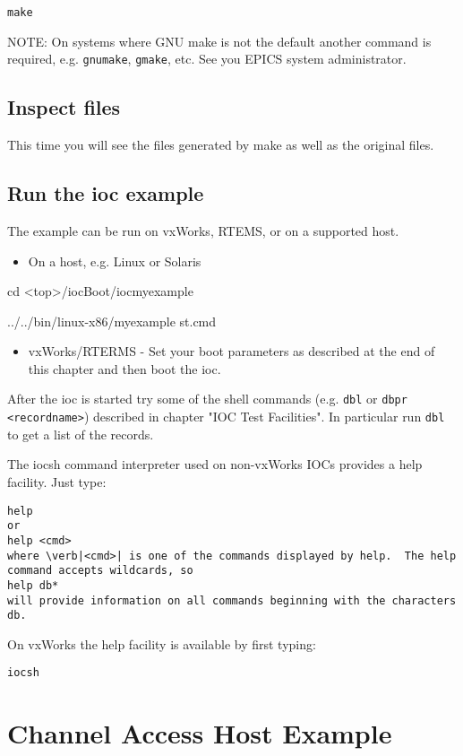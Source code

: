 \begin{verbatim}make
\end{verbatim}NOTE: On systems where GNU make is not the default another command is required, e.g. \verb|gnumake|, \verb|gmake|, etc. See 
you EPICS system administrator.

\subsection{Inspect files}

This time you will see the files generated by make as well as the original files.

\subsection{Run the ioc example}

The example can be run on vxWorks, RTEMS, or on a supported host.

\begin{itemize}\item On a host, e.g. Linux or Solaris

\end{itemize}cd \textless{}top\textgreater{}/iocBoot/iocmyexample

../../bin/linux-x86/myexample st.cmd

\begin{itemize}\item vxWorks/RTERMS - Set your boot parameters as described at the end of this chapter and then boot the ioc.

\end{itemize}After the ioc is started try some of the shell commands (e.g. \verb|dbl| or \verb|dbpr <recordname>|) described in chapter "IOC 
Test Facilities". In particular run \verb|dbl| to get a list of the records.

The iocsh command interpreter used on non-vxWorks IOCs provides a help facility. Just type:

\begin{verbatim}help
or
help <cmd>
where \verb|<cmd>| is one of the commands displayed by help.  The help command accepts wildcards, so
help db*
will provide information on all commands beginning with the characters db.
\end{verbatim}On vxWorks the help facility is available by first typing:

\begin{verbatim}iocsh
\end{verbatim}\section{Channel Access Host Example}

